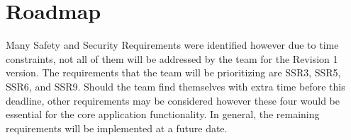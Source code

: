 \documentclass{article}
\begin{document}
\section{Roadmap}

Many Safety and Security Requirements were identified however due to time constraints,
not all of them will be addressed by the team for the Revision 1 version. The requirements
that the team will be prioritizing are SSR3, SSR5, SSR6, and SSR9. Should the team find themselves
with extra time before this deadline, other requirements may be considered however these four
would be essential for the core application functionality. In general, the remaining requirements
will be implemented at a future date.
\end{document}

